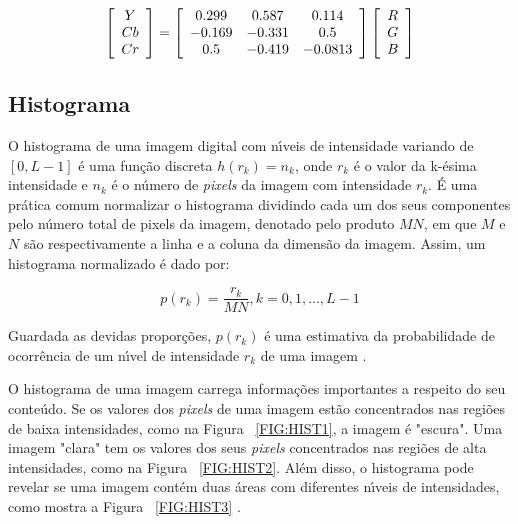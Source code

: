 \begin{equation}
\left[ {\begin{array}{*{20}c}
   Y  \\
   {Cb}  \\
   {Cr}  \\
\end{array}} \right] = \left[ {\begin{array}{*{20}c}
   {0.299} & {0.587} & {0.114}  \\
   { - 0.169} & { - 0.331} & {0.5}  \\
   {0.5} & { - 0.419} & { - 0.0813}  \\
\end{array}} \right]\left[ {\begin{array}{*{20}c}
   R  \\
   G  \\
   B  \\
\end{array}} \right]
\end{equation}

\subsection{Histograma}

O histograma de uma imagem digital com n\'{\i}veis de intensidade variando de $[0, L - 1]$ \'{e} uma fun\c{c}\~{a}o discreta $h(r_k) = n_k$, onde 
$r_k$ \'{e} o valor da k-\'{e}sima intensidade e $n_k$ \'{e} o n\'{u}mero de \emph{pixels} da imagem com intensidade $r_k$. \'{E} uma pr\'{a}tica comum 
normalizar o histograma dividindo cada um dos seus componentes pelo n\'{u}mero total de pixels da imagem, denotado pelo produto $MN$, 
em que $M$ e $N$ s\~{a}o respectivamente a linha e a coluna da dimens\~{a}o da imagem. Assim, um histograma normalizado \'{e} dado por:

\begin{equation}
p(r_k) = \frac{r_k}{MN}, k = 0,1,\ldots,L-1
\end{equation}

Guardada as devidas propor\c{c}\~{o}es, $p(r_k)$ \'{e} uma estimativa da probabilidade de ocorr\^{e}ncia de um n\'{\i}vel de intensidade $r_k$ de uma 
imagem \cite{GONZALEZ:2008}.

O histograma de uma imagem carrega informa\c{c}\~{o}es importantes a respeito do seu conte\'{u}do. Se os valores dos \emph{pixels} de uma 
imagem est\~{a}o concentrados nas regi\~{o}es de baixa intensidades, como na Figura ~\ref{FIG:HIST1}, a imagem \'{e} "escura". Uma imagem 
"clara" tem os valores dos seus \emph{pixels} concentrados nas regi\~{o}es de alta intensidades, como na Figura ~\ref{FIG:HIST2}. Al\'{e}m 
disso, o histograma pode revelar se uma imagem cont\'{e}m duas \'{a}reas com diferentes n\'{\i}veis de intensidades, como mostra a Figura 
~\ref{FIG:HIST3} \cite{PITAS:2000}.

